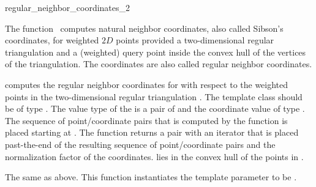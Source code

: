 
\begin{ccRefFunction}{regular_neighbor_coordinates_2}  %

\ccDefinition
  
The function \ccRefName\ computes natural neighbor coordinates, also
called Sibson's coordinates, for weighted $2D$ points provided a
two-dimensional regular triangulation and a (weighted) query point
inside the convex hull of the vertices of the triangulation. The
coordinates are also called regular neighbor coordinates.



 {
  computes the regular neighbor coordinates for  with respect
  to the weighted points in the two-dimensional regular triangulation
  .  The template class  should be of type
  .  The value type of the
   is a pair of  and the
  coordinate value of type . The sequence of
  point/coordinate pairs that is computed by the function is placed
  starting at . The function returns a pair with an iterator
  that is placed past-the-end of the resulting sequence of
  point/coordinate pairs and the normalization factor of the
  coordinates.
  \ccPrecond %
   lies in the convex hull of the
  points in .
  }  

%
{The same as above. This function instantiates the template parameter
   to be .}



\end{ccRefFunction}
